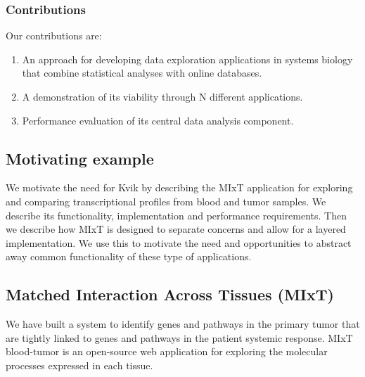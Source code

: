 \subsubsection*{Contributions} 
Our contributions are: 
\begin{enumerate}
\item An approach for developing data exploration applications in systems
biology that combine statistical analyses with online databases.  
\item A demonstration of its viability through N different applications. 
\item Performance evaluation of its central data analysis component. 
\end{enumerate} 



\subsection*{Motivating example}



We motivate the need for Kvik by describing the MIxT application for exploring
and comparing transcriptional profiles from blood and tumor samples. We
describe its functionality, implementation 
and performance requirements.
Then we describe how MIxT
is designed to separate concerns and allow for a layered implementation. We use
this to motivate the need and opportunities to abstract away common
functionality of these type of applications.

\subsection*{Matched Interaction Across Tissues (MIxT)}
We have built a system to identify genes and pathways in the primary tumor that
are tightly linked to genes and pathways in the patient systemic
response\cite{dumeaux2017}. MIxT blood-tumor is an open-source web application
for exploring the molecular processes expressed in each tissue.  

